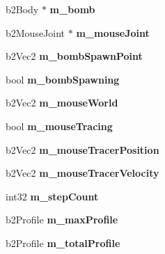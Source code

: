 \begin{DoxyCompactItemize}
\item 
\hypertarget{classTest_a12655cb6ce6b68ce3ac6a445d2a21339}{b2\-Body $\ast$ {\bfseries m\-\_\-bomb}}\label{classTest_a12655cb6ce6b68ce3ac6a445d2a21339}

\item 
\hypertarget{classTest_a0034c1fd7c2417cf2eccb64068c2c0ea}{b2\-Mouse\-Joint $\ast$ {\bfseries m\-\_\-mouse\-Joint}}\label{classTest_a0034c1fd7c2417cf2eccb64068c2c0ea}

\item 
\hypertarget{classTest_ad2dd7ba39707588ef5f1bc27b3d5425d}{b2\-Vec2 {\bfseries m\-\_\-bomb\-Spawn\-Point}}\label{classTest_ad2dd7ba39707588ef5f1bc27b3d5425d}

\item 
\hypertarget{classTest_a27320dd554f06608058fc17c63df3aef}{bool {\bfseries m\-\_\-bomb\-Spawning}}\label{classTest_a27320dd554f06608058fc17c63df3aef}

\item 
\hypertarget{classTest_a7c7cad34d65be96e3e0b5647cb1fb0b1}{b2\-Vec2 {\bfseries m\-\_\-mouse\-World}}\label{classTest_a7c7cad34d65be96e3e0b5647cb1fb0b1}

\item 
\hypertarget{classTest_a47452fcf9cdfaeb770ff877ca1de23ba}{bool {\bfseries m\-\_\-mouse\-Tracing}}\label{classTest_a47452fcf9cdfaeb770ff877ca1de23ba}

\item 
\hypertarget{classTest_afc0307509c7619d99e06177d25b7da0c}{b2\-Vec2 {\bfseries m\-\_\-mouse\-Tracer\-Position}}\label{classTest_afc0307509c7619d99e06177d25b7da0c}

\item 
\hypertarget{classTest_a84b1e492afdaa8196a834ef1256f7ae0}{b2\-Vec2 {\bfseries m\-\_\-mouse\-Tracer\-Velocity}}\label{classTest_a84b1e492afdaa8196a834ef1256f7ae0}

\item 
\hypertarget{classTest_aeba7befe157e2897d4f4cbae18cfe87a}{int32 {\bfseries m\-\_\-step\-Count}}\label{classTest_aeba7befe157e2897d4f4cbae18cfe87a}

\item 
\hypertarget{classTest_a62c3b995fdfb0cbdfb8443c5af0147d7}{b2\-Profile {\bfseries m\-\_\-max\-Profile}}\label{classTest_a62c3b995fdfb0cbdfb8443c5af0147d7}

\item 
\hypertarget{classTest_a620017b99e7e4d2d3ff17a89faebc00b}{b2\-Profile {\bfseries m\-\_\-total\-Profile}}\label{classTest_a620017b99e7e4d2d3ff17a89faebc00b}


\end{DoxyCompactItemize}
